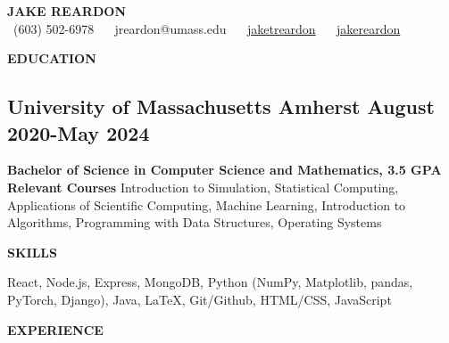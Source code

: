 \documentclass{article}
\begin{document}

\newcommand\project[3]
{
  \subsection*{#1}
  \textbf{Technologies:} #2
  #3
}



\begin{center}
\Large\textbf{\lsstyle JAKE REARDON} \\
\vspace{6pt}
\small \faPhone\ (603) 502-6978 ~
\faEnvelope\  jreardon@umass.edu ~
\faLinkedin\  \href{http://www.linkedin.com/in/jaketreardon}{jaketreardon} ~
\faGithub\  \href{https://github.com/jakereardon}{jakereardon}
\end{center}


\vspace{3pt}
\begin{center}\selectfont\textbf{\lsstyle EDUCATION}\end{center}

\subsection*{University of Massachusetts Amherst \hfill August 2020-May 2024}
\textbf{Bachelor of Science in Computer Science and Mathematics, 3.5 GPA} \\
\textbf{Relevant Courses}
Introduction to Simulation,
Statistical Computing,
Applications of Scientific Computing,
Machine Learning,
Introduction to Algorithms,
Programming with Data Structures,
Operating Systems


\vspace{5pt}
\begin{center}\selectfont\textbf{\lsstyle SKILLS}\end{center}
React, Node.js, Express, MongoDB, Python (NumPy, Matplotlib, pandas, PyTorch, Django), Java, LaTeX, Git/Github, HTML/CSS, JavaScript


\vspace{5pt}
\begin{center}\selectfont\textbf{\lsstyle EXPERIENCE}\end{center}
\end{document}
